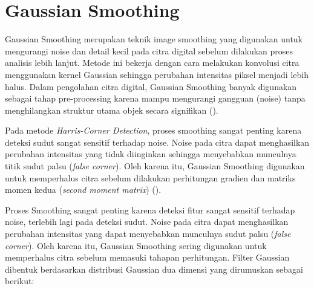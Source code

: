 \section{Gaussian Smoothing}
Gaussian Smoothing merupakan teknik image smoothing yang digunakan untuk mengurangi noise dan detail kecil pada citra digital sebelum dilakukan proses analisis lebih lanjut.
Metode ini bekerja dengan cara melakukan konvolusi citra menggunakan kernel Gaussian sehingga perubahan intensitas piksel menjadi lebih halus.
Dalam pengolahan citra digital, Gaussian Smoothing banyak digunakan sebagai tahap pre-processing karena mampu mengurangi gangguan (noise) tanpa menghilangkan struktur utama objek secara signifikan (\cite{Gonzalez2018}).

Pada metode \emph{Harris-Corner Detection}, proses smoothing sangat penting karena deteksi sudut sangat sensitif terhadap noise. Noise pada citra dapat menghasilkan perubahan intensitas yang tidak diinginkan sehingga menyebabkan munculnya titik sudut palsu (\emph{false corner}). 
Oleh karena itu, Gaussian Smoothing digunakan untuk memperhalus citra sebelum dilakukan perhitungan gradien dan matriks momen kedua (\emph{second moment matrix}) (\cite{Sanchez2018}).

Proses Smoothing sangat penting karena deteksi fitur sangat sensitif terhadap noise, terlebih lagi pada deteksi sudut. Noise pada citra dapat menghasilkan perubahan intensitas yang dapat menyebabkan munculnya sudut palsu (\emph{false corner}). Oleh karena itu, Gaussian Smoothing sering digunakan untuk memperhalus citra sebelum memasuki tahapan perhitungan.
Filter Gaussian dibentuk berdasarkan distribusi Gaussian dua dimensi yang dirumuskan sebagai berikut:


